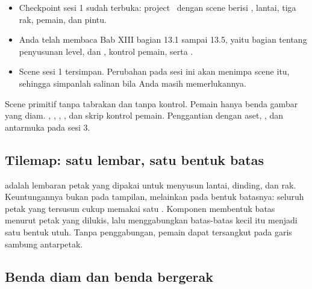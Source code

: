 
\begin{prasyaratbox}
\begin{itemize}[leftmargin=1.4em, itemsep=0.25em]
  \item Checkpoint sesi 1 sudah terbuka: project \NamaProject\ dengan scene
         berisi , lantai, tiga rak, pemain, dan
        pintu.
  \item Anda telah membaca Bab XIII bagian 13.1 sampai 13.5, yaitu bagian
        tentang penyusunan level,  dan ,
        kontrol pemain, serta .
  \item Scene sesi 1 tersimpan. Perubahan pada sesi ini akan menimpa scene
        itu, sehingga simpanlah salinan bila Anda masih memerlukannya.
\end{itemize}
\end{prasyaratbox}


\petasesi
  {Scene primitif tanpa tabrakan dan tanpa kontrol. Pemain hanya benda
   gambar yang diam.}
  {, , ,
   , dan skrip kontrol pemain.}
  {Penggantian  dengan aset, , dan
    antarmuka pada sesi 3.}


\subsection*{Tilemap: satu lembar, satu bentuk batas}

 adalah lembaran petak yang dipakai untuk menyusun lantai,
dinding, dan rak. Keuntungannya bukan pada tampilan, melainkan pada bentuk
batasnya: seluruh petak yang tersusun cukup memakai satu .
Komponen  membentuk batas menurut petak yang
dilukis, lalu  menggabungkan batas-batas kecil itu
menjadi satu bentuk utuh. Tanpa penggabungan, pemain dapat tersangkut pada
garis sambung antarpetak.

\subsection*{Benda diam dan benda bergerak}

